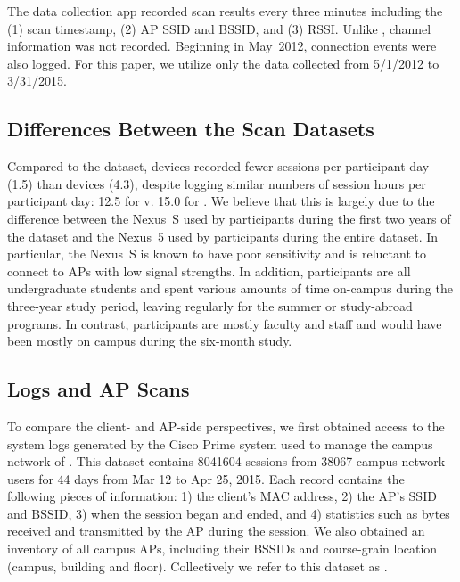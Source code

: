 The \NetSense{} data collection app recorded scan results every three
minutes including the (1) scan timestamp, (2) AP SSID and BSSID, and (3) RSSI.
Unlike \ubscan{}, channel information was not recorded.  Beginning in May~2012,
\wifi{} connection events were also logged. For this paper, we utilize only the
data collected from 5/1/2012 to 3/31/2015.

\subsection{Differences Between the Scan Datasets}


Compared to the \ubscan{} dataset, \NetSense{} devices recorded fewer sessions
per participant day (1.5) than \PhoneLab{} devices (4.3), despite logging
similar numbers of session hours per participant day: 12.5 for \ndscan{} v. 15.0
for \ubscan{}. We believe that this is largely due to the difference between the
Nexus~S used by \NetSense{} participants during the first two years of the
\ndscan{} dataset and the Nexus~5 used by \PhoneLab{} participants during the
entire \ubscan{} dataset. In particular, the Nexus~S is known to have poor
\wifi{} sensitivity and is reluctant to connect to APs with
low signal strengths. In addition, \NetSense{} participants are all
undergraduate students and spent various amounts of time on-campus during the
three-year study period, leaving regularly for the summer or study-abroad
programs. In contrast, \PhoneLab{} participants are mostly faculty and staff and
would have been mostly on campus during the six-month study.

\subsection{\ub{} \wifi{} Logs and AP Scans}
\label{subsec:cit}

To compare the client- and AP-side perspectives, we first obtained access to the
system logs generated by the Cisco Prime system used to manage
the campus \wifi{} network of \ub{}. This dataset contains \num{8041604} \wifi{}
sessions from \num{38067} \ub{} campus network users for 44 days from Mar 12 to
Apr 25, 2015. Each record contains the following pieces of information: 1) the client's MAC
address, 2) the AP's SSID and BSSID, 3) when the \wifi{} session began and
ended, and 4) statistics such as bytes received and transmitted by the AP during
the session. We also obtained an inventory of all \ub{} campus APs, including
their BSSIDs and course-grain location (campus, building and floor).
Collectively we refer to this dataset as \textbf{\ubap{}}.

